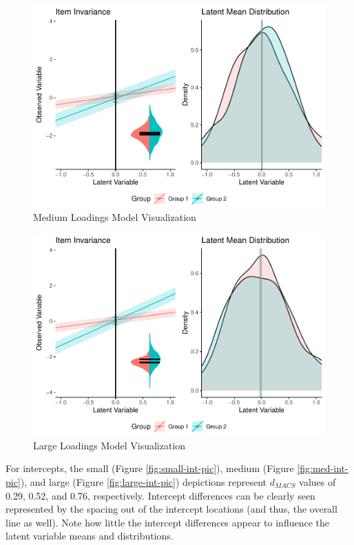 \documentclass[
  man]{apa6}
\begin{document}
\begin{figure}
\centering
\includegraphics{manuscript_files/figure-latex/med-load-pic-1.pdf}
\caption{\label{fig:med-load-pic}Medium Loadings Model Visualization}
\end{figure}

\begin{figure}
\centering
\includegraphics{manuscript_files/figure-latex/large-load-pic-1.pdf}
\caption{\label{fig:large-load-pic}Large Loadings Model Visualization}
\end{figure}

For intercepts, the small (Figure \ref{fig:small-int-pic}), medium (Figure \ref{fig:med-int-pic}), and large (Figure \ref{fig:large-int-pic}) depictions represent \(d_{MACS}\) values of 0.29, 0.52, and 0.76, respectively. Intercept differences can be clearly seen represented by the spacing out of the intercept locations (and thus, the overall line as well). Note how little the intercept differences appear to influence the latent variable means and distributions.
\end{document}
